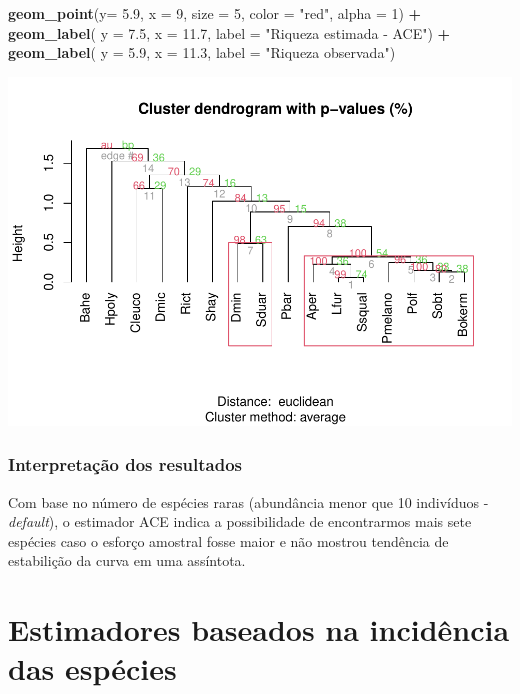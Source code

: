 \documentclass[
]{book}
\newenvironment{Shaded}{\begin{snugshade}}{\end{snugshade}}
\newcommand{\DataTypeTok}[1]{\textcolor[rgb]{0.13,0.29,0.53}{#1}}
\newcommand{\DecValTok}[1]{\textcolor[rgb]{0.00,0.00,0.81}{#1}}
\newcommand{\FloatTok}[1]{\textcolor[rgb]{0.00,0.00,0.81}{#1}}
\newcommand{\KeywordTok}[1]{\textcolor[rgb]{0.13,0.29,0.53}{\textbf{#1}}}
\newcommand{\NormalTok}[1]{#1}
\newcommand{\OperatorTok}[1]{\textcolor[rgb]{0.81,0.36,0.00}{\textbf{#1}}}
\newcommand{\StringTok}[1]{\textcolor[rgb]{0.31,0.60,0.02}{#1}}
\begin{document}
\begin{Shaded}
\begin{Highlighting}[]
\StringTok{  }\KeywordTok{geom_point}\NormalTok{(}\DataTypeTok{y=} \FloatTok{5.9}\NormalTok{, }\DataTypeTok{x =} \DecValTok{9}\NormalTok{, }\DataTypeTok{size =} \DecValTok{5}\NormalTok{, }\DataTypeTok{color =} \StringTok{"red"}\NormalTok{, }\DataTypeTok{alpha =} \DecValTok{1}\NormalTok{) }\OperatorTok{+}\StringTok{ }
\StringTok{  }\KeywordTok{geom_label}\NormalTok{( }\DataTypeTok{y =} \FloatTok{7.5}\NormalTok{, }\DataTypeTok{x =} \FloatTok{11.7}\NormalTok{, }\DataTypeTok{label =} \StringTok{"Riqueza estimada - ACE"}\NormalTok{) }\OperatorTok{+}
\StringTok{  }\KeywordTok{geom_label}\NormalTok{( }\DataTypeTok{y =} \FloatTok{5.9}\NormalTok{, }\DataTypeTok{x =} \FloatTok{11.3}\NormalTok{, }\DataTypeTok{label =} \StringTok{"Riqueza observada"}\NormalTok{)}
\end{Highlighting}
\end{Shaded}

\includegraphics{livro_r_ecologia_files/figure-latex/unnamed-chunk-7-1.pdf}

\hypertarget{interpretauxe7uxe3o-dos-resultados-3}{%
\subsubsection{Interpretação dos resultados}\label{interpretauxe7uxe3o-dos-resultados-3}}

Com base no número de espécies raras (abundância menor que 10 indivíduos - \emph{default}), o estimador ACE indica a possibilidade de encontrarmos mais sete espécies caso o esforço amostral fosse maior e não mostrou tendência de estabilição da curva em uma assíntota.

\hypertarget{estimadores-baseados-na-inciduxeancia-das-espuxe9cies}{%
\section{Estimadores baseados na incidência das espécies}\label{estimadores-baseados-na-inciduxeancia-das-espuxe9cies}}
\end{document}
